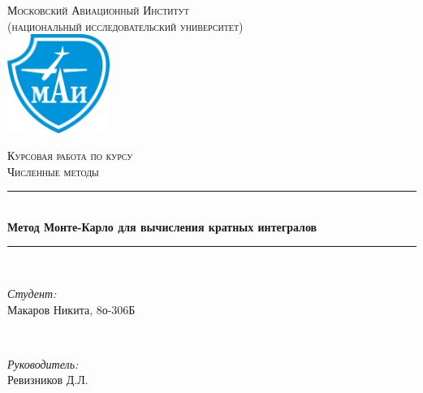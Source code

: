 \documentclass[a4paper,12pt]{article}
\begin{document}
\begin{titlepage}

\newcommand{\HRule}{\rule{\linewidth}{0.5mm}} %

\center %



\textsc{\large Московский Авиационный Институт\\(национальный исследовательский университет)}\\[1.5cm] %

\includegraphics[width=0.25\textwidth]{mai.png}\\[1cm]
\vspace{40px}

\textsc{\Large Курсовая работа по курсу\\ \guillemotleft Численные методы\guillemotright}\\[0.5cm]

\HRule \\[0.4cm]
{ \huge \bfseries Метод Монте-Карло для вычисления кратных интегралов}\\[0.4cm] %
\HRule \\[1.5cm]

\begin{minipage}{0.4\textwidth}
\begin{flushleft} \large
\emph{Студент:}\\
Макаров Никита, 8о-306Б
\end{flushleft}
\end{minipage}
~
\begin{minipage}{0.4\textwidth}
\begin{flushright} \large
\emph{Руководитель:} \\
Ревизников Д.Л.
\end{flushright}
\end{minipage}\\[2cm]


\end{titlepage}
\end{document}
